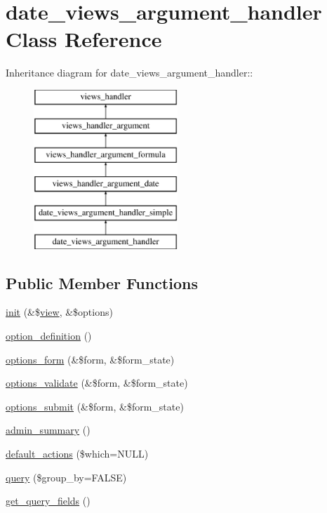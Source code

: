 \hypertarget{classdate__views__argument__handler}{
\section{date\_\-views\_\-argument\_\-handler Class Reference}
\label{classdate__views__argument__handler}
}
Inheritance diagram for date\_\-views\_\-argument\_\-handler::\begin{figure}[H]
\begin{center}
\leavevmode
\includegraphics[height=6cm]{classdate__views__argument__handler}
\end{center}
\end{figure}
\subsection*{Public Member Functions}
\begin{DoxyCompactItemize}
\item 
\hyperlink{classdate__views__argument__handler_a8dd865de550c6c5d34ab8aea1d3ba204}{init} (\&\$\hyperlink{classview}{view}, \&\$options)
\item 
\hyperlink{classdate__views__argument__handler_adb343ee7cff6d4db4744cd7af723d03f}{option\_\-definition} ()
\item 
\hyperlink{classdate__views__argument__handler_a590b98bc076d465f778862b82c76f6e5}{options\_\-form} (\&\$form, \&\$form\_\-state)
\item 
\hyperlink{classdate__views__argument__handler_ae970be5da3129fef9deaf4ccc2274e6c}{options\_\-validate} (\&\$form, \&\$form\_\-state)
\item 
\hyperlink{classdate__views__argument__handler_ac9c3618a380bf3dadb6500c5e4a32cb5}{options\_\-submit} (\&\$form, \&\$form\_\-state)
\item 
\hyperlink{classdate__views__argument__handler_a628ee4d992b0417645e0aafeeb733b28}{admin\_\-summary} ()
\item 
\hyperlink{classdate__views__argument__handler_a04e1475ee2f7f3d532342a91cde08970}{default\_\-actions} (\$which=NULL)
\item 
\hyperlink{classdate__views__argument__handler_aa7df86c9e200ef7e797e1ba4f2fa1158}{query} (\$group\_\-by=FALSE)
\item 
\hyperlink{classdate__views__argument__handler_a802f732806264b5d49ab336b58605c30}{get\_\-query\_\-fields} ()
\end{DoxyCompactItemize}


